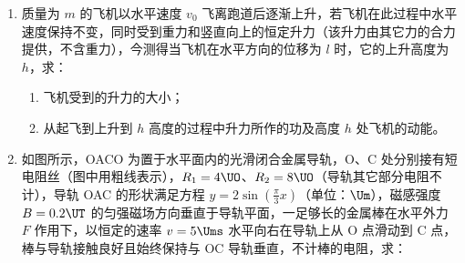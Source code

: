 \documentclass[\gkver]{gaokaozhenti}
\begin{document}
\begin{enumerate}
{斜面底宽 $l=h\cot\theta=0.2\times\sqrt{3}\Um=0.35\Um$。

又 $l<s$，故小球离开 A 点后不会落到斜面上，因此落地时间即为平抛运动时间，有 $t=\sqrt{\frac{2h}{g}}=\sqrt{\frac{2\times0.2}{10}}\Us=0.2\Us$。
}

\item
质量为 $m$ 的飞机以水平速度 $v_{0}$ 飞离跑道后逐渐上升，若飞机在此过程中水平速度保持不变，同时受到重力和竖直向上的恒定升力（该升力由其它力的合力提供，不含重力），今测得当飞机在水平方向的位移为 $l$ 时，它的上升高度为 $h$，求：

\begin{enumerate}
	\item
	飞机受到的升力的大小；
	\item
	从起飞到上升到 $h$ 高度的过程中升力所作的功及高度 $h$ 处飞机的动能。
\end{enumerate}

\onepicture[align=right, w=4.26cm]{}


\item
如图所示，OACO 为置于水平面内的光滑闭合金属导轨，O、C 处分别接有短电阻丝（图中用粗线表示），$R_{1}=4\UO$、$R_{2}=8\UO$（导轨其它部分电阻不计），导轨 OAC 的形状满足方程 $y=2\sin\left(\frac{\pi}{3}x\right)$（单位：$\Um$），磁感强度 $B=0.2\UT$ 的匀强磁场方向垂直于导轨平面，一足够长的金属棒在水平外力 $F$ 作用下，以恒定的速率 $v=5\Ums$ 水平向右在导轨上从 O 点滑动到 C 点，棒与导轨接触良好且始终保持与 OC 导轨垂直，不计棒的电阻，求：


\end{enumerate}
\end{document}
